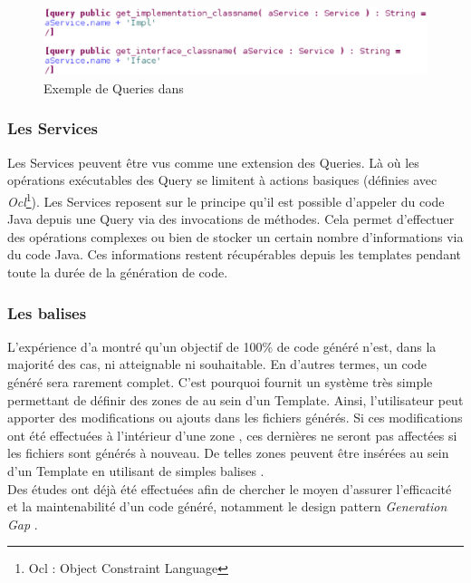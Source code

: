 \begin{figure}[htb]
  \centering
  \includegraphics[scale=0.6]{img/screen_query.eps}
  \caption{Exemple de Queries dans \kwacceleo{}}
  \label{fig:acc_module}
\end{figure}

\subsubsection{Les Services}

Les Services peuvent être vus comme une extension des Queries. Là où les opérations exécutables des Query se limitent à actions basiques (définies avec \textit{Ocl}\footnote{Ocl : Object Constraint Language}). Les Services reposent sur le principe qu'il est possible d'appeler du code Java depuis une Query via des invocations de méthodes. Cela permet d'effectuer des opérations complexes ou bien de stocker un certain nombre d'informations via du code Java. Ces informations restent récupérables depuis les templates pendant toute la durée de la génération de code.

\subsubsection{Les balises }

L'expérience d'\kwobeo a montré qu'un objectif de 100\% de code généré n'est, dans la majorité des cas, ni atteignable ni souhaitable.
En d'autres termes, un code généré sera rarement complet. C'est pourquoi \kwacceleo fournit un système très simple permettant de définir des zones de  au sein d'un Template. Ainsi, l'utilisateur peut apporter des modifications ou ajouts dans les fichiers générés. Si ces modifications ont été effectuées à l'intérieur d'une zone , ces dernières ne seront pas affectées si les fichiers sont générés à nouveau.
De telles zones peuvent être insérées au sein d'un Template en utilisant de simples balises \guim{\textit{\textbf{[protected]}}}.
\\
Des études ont déjà été effectuées afin de chercher le moyen d'assurer l'efficacité et la maintenabilité d'un code généré, notamment le design pattern \textit{Generation Gap} \cite{gen_gap}.

